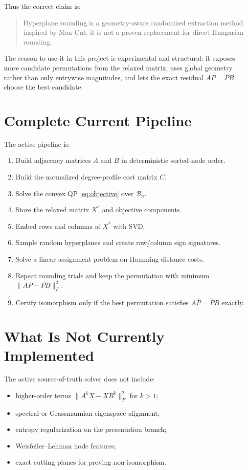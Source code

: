 \documentclass[11pt]{article}
\begin{document}
Thus the correct claim is:
\begin{quote}
Hyperplane rounding is a geometry-aware randomized extraction method inspired
by Max-Cut; it is not a proven replacement for direct Hungarian rounding.
\end{quote}

The reason to use it in this project is experimental and structural:
it exposes more candidate permutations from the relaxed matrix, uses global
geometry rather than only entrywise magnitudes, and lets the exact residual
$AP=PB$ choose the best candidate.

\section{Complete Current Pipeline}

The active pipeline is:
\begin{enumerate}[leftmargin=*]
    \item Build adjacency matrices $A$ and $B$ in deterministic sorted-node
    order.
    \item Build the normalized degree-profile cost matrix $C$.
    \item Solve the convex QP \eqref{eq:objective} over $\mathcal{B}_n$.
    \item Store the relaxed matrix $X^*$ and objective components.
    \item Embed rows and columns of $X^*$ with SVD.
    \item Sample random hyperplanes and create row/column sign signatures.
    \item Solve a linear assignment problem on Hamming-distance costs.
    \item Repeat rounding trials and keep the permutation with minimum
    $\|AP-PB\|_F^2$.
    \item Certify isomorphism only if the best permutation satisfies
    $A\hat P=\hat P B$ exactly.
\end{enumerate}

\section{What Is Not Currently Implemented}

The active source-of-truth solver does not include:
\begin{itemize}[leftmargin=*]
    \item higher-order terms $\|A^kX-XB^k\|_F^2$ for $k>1$;
    \item spectral or Grassmannian eigenspace alignment;
    \item entropy regularization on the presentation branch;
    \item Weisfeiler--Lehman node features;
    \item exact cutting planes for proving non-isomorphism.
\end{itemize}
\end{document}
